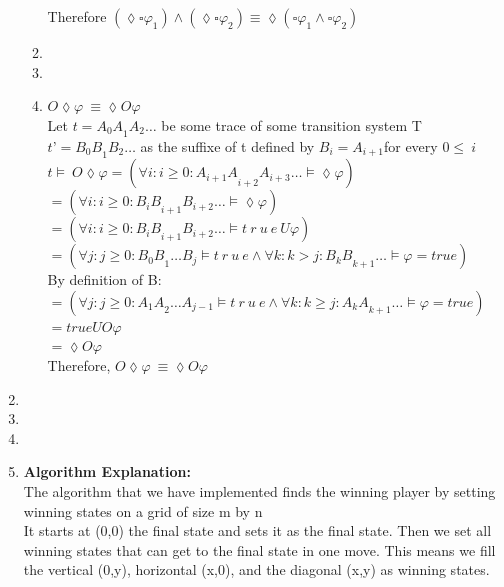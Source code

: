 \documentclass[a4paper,12pt]{article}
\begin{document}
\begin{enumerate}
\begin{enumerate}
			Therefore $(\lozenge\square\varphi_1)\wedge(\lozenge\square\varphi_2)\equiv\lozenge(\square\varphi_1\wedge\square\varphi_2)$\\
			\item
			\item
			\item 	$O\lozenge\varphi\ \equiv\lozenge O\varphi$\\
			Let $t={A_0A}_1A_2\ldots$ be some trace of some transition system T\\
			$t’ = {B_0B}_1B_2\ldots$ as the suffixe of t defined by $B_i=A_{i+1}$for every $0\le\ i$\\
			
			$t \models\ O\lozenge\varphi=\left(\forall
			i:i\geq0:{A_{i+1}A}_{i+2}A_{i+3}\ldots\models\lozenge\varphi\right)$\\
			$=\left(\forall i:i\geq0:{B_iB}_{i+1}B_{i+2}\ldots\models\lozenge\varphi\right)$\\
			$=\left(\forall i:i\geq0:{B_iB}_{i+1}B_{i+2}\ldots\models t\ r\ u\ e\ U\varphi\right)$\\
			$=\left(\forall j:j\geq0:{B_0B}_1{\ldots B}_j\models t\ r\ u\ e\land\forall k:k>j:{B_kB}_{k+1}\ldots\models\varphi=true\right)$\\
			
			By definition of B:
			$=\left(\forall j:j\geq0:{A_1A}_2{\ldots A}_{j-1}\models t\ r\ u\ e\land\forall k:k\geq j:{A_kA}_{k+1}\ldots\models\varphi=true\right)$\\
			$=true U O\varphi$\\
			$= \lozenge O\varphi$\\
			
			Therefore, $O\lozenge\varphi\ \equiv\lozenge O\varphi$
			
			
		\end{enumerate}
		\item 
		\item 
		\item 
		\item 
		
		\textbf{Algorithm Explanation:}\\
		
		The algorithm that we have implemented finds the winning player by setting winning states on a grid of size m by n\\
		
		It starts at (0,0) the final state and sets it as the final state. Then we set all winning states that can get to the final state in one move. This means we fill the vertical (0,y), horizontal (x,0), and the diagonal (x,y) as winning states.\\
		

\end{enumerate}
\end{document}
